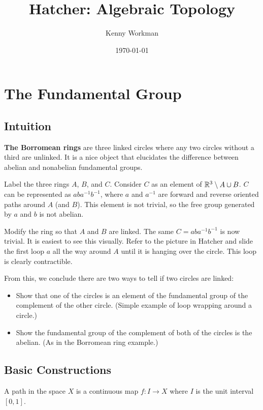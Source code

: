 \documentclass[10pt]{article}
\title{Hatcher: Algebraic Topology}
\author{Kenny Workman}
\date{\today}
\begin{document}
\maketitle

\section{The Fundamental Group}

\subsection{Intuition}

\textbf{The Borromean rings} are three linked circles where any two circles without a third are unlinked. It is a nice object that elucidates the difference between abelian and nonabelian fundamental groups.

Label the three rings $A$, $B$, and $C$. Consider $C$ as an element of $\mathbb{R}^3 \setminus A \cup B$. $C$ can be represented as $aba^{-1}b^{-1}$, where $a$ and $a^{-1}$ are forward and reverse oriented paths around $A$ (and $B$). This element is not trivial, so the free group generated by $a$ and $b$ is not abelian.

Modify the ring so that $A$ and $B$ are linked. The same $C = aba^{-1}b^{-1}$ is now trivial. It is easiest to see this visually. Refer to the picture in Hatcher and slide the first loop $a$ all the way around $A$ until it is hanging over the circle. This loop is clearly contractible.

From this, we conclude there are two ways to tell if two circles are linked:

\begin{itemize}
	\item{Show that one of the circles is an element of the fundamental group of the complement of the other circle. (Simple example of loop wrapping around a circle.)}
	\item{Show the fundamental group of the complement of both of the circles is the abelian. (As in the Borromean ring example.)}
\end{itemize}

\subsection{Basic Constructions}

\begin{definition}[Path]
A path in the space $X$ is a continuous map $f: I \to X$ where $I$ is the unit
interval $[0, 1]$.
\end{definition}
\end{document}
